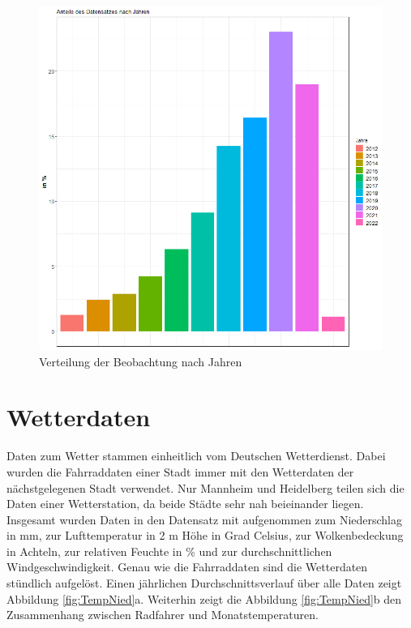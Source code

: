 \documentclass[a4paper,12pt]{thesis}
\begin{document}
\begin{figure}[!ht]
	\centering
	\includegraphics[width=\textwidth]{Plots/plot28.png}
	\caption{Verteilung der Beobachtung nach Jahren}
	\label{Jahre}
\end{figure}

\section{Wetterdaten}

Daten zum Wetter stammen einheitlich vom Deutschen Wetterdienst. Dabei wurden die Fahrraddaten einer Stadt immer mit den Wetterdaten der nächstgelegenen Stadt verwendet. Nur Mannheim und Heidelberg teilen sich die Daten einer Wetterstation, da beide Städte sehr nah beieinander liegen. Insgesamt wurden Daten in den Datensatz mit aufgenommen zum Niederschlag in mm, zur Lufttemperatur in 2 m Höhe in Grad Celsius, zur Wolkenbedeckung in Achteln, zur relativen Feuchte in \% und zur durchschnittlichen Windgeschwindigkeit. Genau wie die Fahrraddaten sind die Wetterdaten stündlich aufgelöst. Einen jährlichen Durchschnittsverlauf über alle Daten zeigt Abbildung \ref{fig:TempNied}a. Weiterhin zeigt die Abbildung \ref{fig:TempNied}b den Zusammenhang zwischen Radfahrer und Monatstemperaturen.
\end{document}
